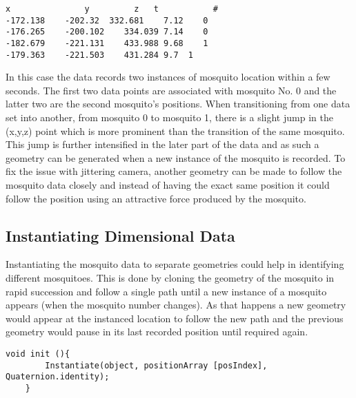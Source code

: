 \bigskip
\begin{code1}
\begin{verbatim}
x	            y	      z	  t           #
-172.138	-202.32	 332.681	7.12	0
-176.265	-200.102	334.039	7.14	0
-182.679	-221.131	433.988	9.68	1
-179.363	-221.503	431.284	9.7	 1
\end{verbatim}
\label{code:TwoFly}
\end{code1}

In this case the data records two instances of mosquito location within a few seconds. The first two data points are associated with mosquito No. 0 and the latter two are the second mosquito's positions. When transitioning from one data set into another, from mosquito 0 to mosquito 1, there is a slight jump in the (x,y,z) point which is more prominent than the transition of the same mosquito. This jump is further intensified in the later part of the data and as such a geometry can be generated when a new instance of the mosquito is recorded. To fix the issue with jittering camera, another geometry can be made to follow the mosquito data closely and instead of having the exact same position it could follow the position using an attractive force produced by the mosquito.

\subsection{Instantiating Dimensional Data}

Instantiating the mosquito data to separate geometries could help in identifying different mosquitoes. This is done by cloning the geometry of the mosquito in rapid succession and follow a single path until a new instance of a mosquito appears (when the mosquito number changes). As that happens a new geometry would appear at the instanced location to follow the new path and the previous geometry would pause in its last recorded position until required again.

\bigskip
\begin{code1}
\begin{verbatim}
void init (){
		Instantiate(object, positionArray [posIndex], Quaternion.identity);
	}
\end{verbatim}
\label{code:InstantiateEx}
\end{code1}


